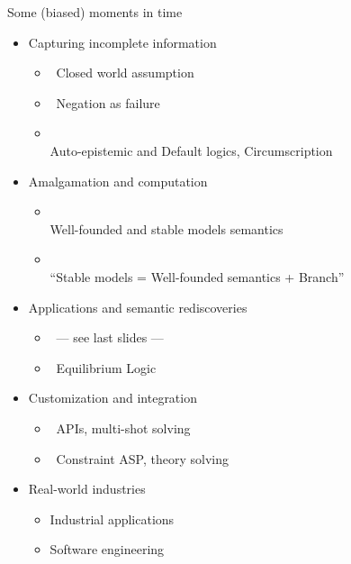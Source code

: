 \begin{frame}{Some (biased) moments in time}
  \bigskip
  \begin{itemize}
  \item<1-7> Capturing incomplete information
    \begin{itemize}
    \item<only@2>  \ Closed world assumption
    \item<only@2>  \ Negation as failure
    \item<only@2> \\ Auto-epistemic and Default logics, Circumscription
    \end{itemize}
    \smallskip
  \item<1-7> Amalgamation and computation
    \begin{itemize}
    \item<only@3> \\ Well-founded and stable models semantics
    \item<only@3> \\ ``Stable models = Well-founded semantics + Branch''
    \end{itemize}
    \smallskip
  \item<1-7> Applications and semantic rediscoveries
    \begin{itemize}
    \item<only@4>  \ --- see last slides ---
    \item<only@4>    \ Equilibrium Logic
    \end{itemize}
    \smallskip
  \item<1-7> Customization and integration
    \begin{itemize}
    \item <only@5>  \ APIs, multi-shot solving
    \item <only@5>  \ Constraint ASP, theory solving
    \end{itemize}
    \smallskip
  \item <7>  Real-world industries
    \begin{itemize}
    \item Industrial applications
    \item Software engineering
    \end{itemize}
  \end{itemize}
\end{frame}
%
